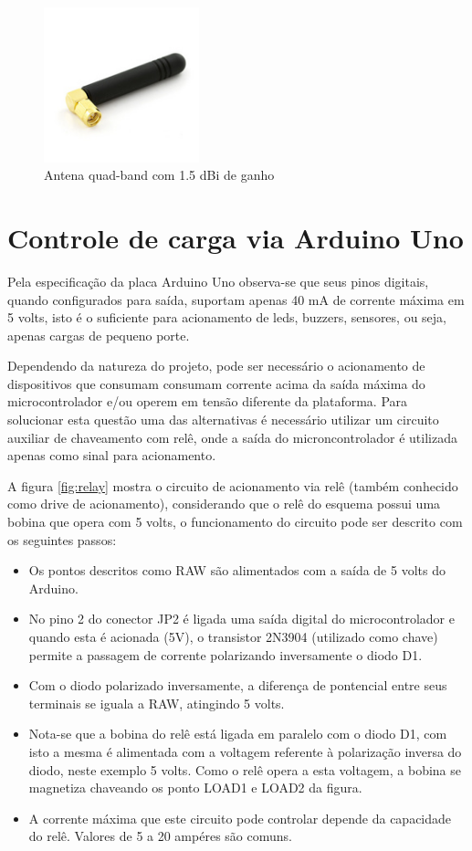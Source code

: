 \begin{figure}[h!]
			\centering
			\includegraphics[width=0.4\textwidth]{figures/antena.jpg}
			\caption{Antena quad-band com 1.5 dBi de ganho}
			\label{fig:antenna}
\end{figure}

\section{Controle de carga via Arduino Uno}

Pela especificação da placa Arduino Uno observa-se que seus pinos digitais, quando configurados para saída, suportam apenas 40 mA de corrente máxima em 5 volts, isto é o suficiente para acionamento de leds, buzzers, sensores, ou seja, apenas cargas de pequeno porte.

Dependendo da natureza do projeto, pode ser necessário o acionamento de dispositivos que consumam consumam corrente acima da saída máxima do microcontrolador e/ou operem em tensão diferente da plataforma. Para solucionar esta questão uma das alternativas é necessário utilizar um circuito auxiliar de chaveamento com relê, onde a saída do microncontrolador é utilizada apenas como sinal para acionamento.

A figura \ref{fig:relay} mostra o circuito de acionamento via relê (também conhecido como drive de acionamento), considerando que o relê do esquema possui uma bobina que opera com 5 volts, o funcionamento do circuito pode ser descrito com os seguintes passos: 

\begin{itemize}
	\item Os pontos descritos como RAW são alimentados com a saída de 5 volts do Arduino.
	\item No pino 2 do conector JP2 é ligada uma saída digital do microcontrolador e quando esta é acionada (5V), o transistor 2N3904 (utilizado como chave) permite a passagem de corrente polarizando inversamente o diodo D1.
	\item Com o diodo polarizado inversamente, a diferença de pontencial entre seus terminais se iguala a RAW, atingindo 5 volts.
	\item Nota-se que a bobina do relê está ligada em paralelo com o diodo D1, com isto a mesma é alimentada com a voltagem referente à polarização inversa do diodo, neste exemplo 5 volts. Como o relê opera a esta voltagem, a bobina se magnetiza chaveando os ponto LOAD1 e LOAD2 da figura.
	\item A corrente máxima que este circuito pode controlar depende da capacidade do relê. Valores de 5 a 20 ampéres são comuns.
\end{itemize}

